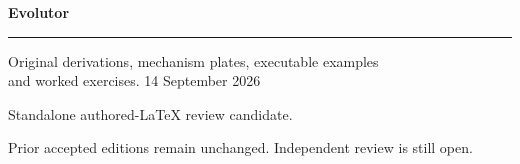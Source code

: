 \documentclass[11pt,oneside,openany]{book}
\begin{document}
\frontmatter
\begin{titlepage}
\color{Blue}\sffamily\vspace*{20mm}
{\Huge\bfseries Evolutor\par}
\vspace{10mm}{\LARGE Chapter 4\par}
\vspace{8mm}{\Large Reproducible PyTorch training\par}
\vspace{12mm}\rule{\linewidth}{.8pt}
\vspace{6mm}\par Original derivations, mechanism plates, executable examples\\and worked exercises.
\vfill 14 September 2026\par
Standalone authored-LaTeX review candidate.\par
Prior accepted editions remain unchanged. Independent review is still open.
\end{titlepage}
\tableofcontents
\mainmatter
\setcounter{chapter}{3}

\backmatter

\printindex
\end{document}
